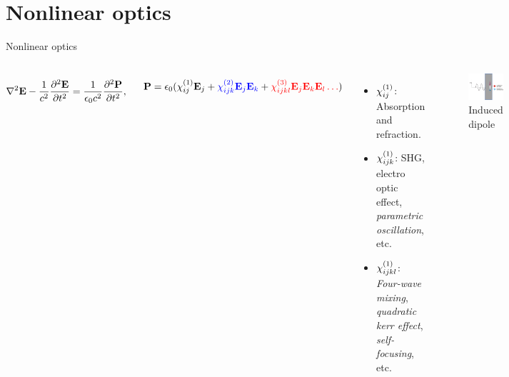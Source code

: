 \section{Nonlinear optics}

\begin{frame}{Nonlinear optics}

  \begin{columns}


    \begin{align*}
      \label{eq:wave-general}
      \nabla^2 \mathbf E - \frac{1}{c^2} \frac{\partial^2 \mathbf E}{\partial t^2}
      = \frac{1}{\epsilon_0c^2} \frac{\partial^2 \mathbf P}{\partial t^2},
    \end{align*}

    \[
    \mathbf P = \epsilon_0 ( \textcolor{black}{\chi^{\textup{(1)}}_{ij} \mathbf E_{j}}
    + \textcolor{blue}{\chi^{\textup{(2)}}_{ijk} \mathbf E_{j} \mathbf E_{k}}
    + \textcolor{red}{\chi^{\textup{(3)}}_{ijkl} \mathbf E_{j} \mathbf E_{k} \mathbf E_{l} \dots} )
    \]


    \begin{itemize}
    \item \color{black} $\chi^{\textup{(1)}}_{ij}$: Absorption and refraction.
    \item \color{blue}  $\chi^{\textup{(1)}}_{ijk}$: SHG, electro optic effect, \textit{parametric
        oscillation}, etc.
    \item \color{red}   $\chi^{\textup{(1)}}_{ijkl}$: \textit{Four-wave mixing}, \textit{quadratic kerr effect},
      \textit{self-focusing}, etc.
    \end{itemize}

    \begin{figure}
      \centering
      \includegraphics[width=\columnwidth]{inducedDipole2}
      \caption{Induced dipole}
      \label{fig:indDipole}
    \end{figure}


  \end{columns}
\end{frame}



